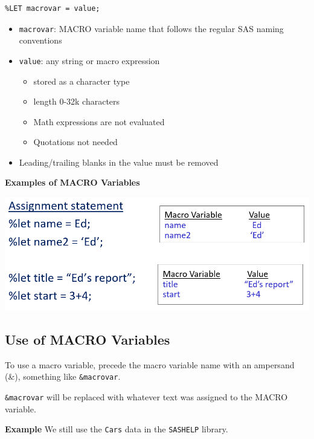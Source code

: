 \documentclass[
]{book}
\providecommand{\tightlist}{%
  \setlength{\itemsep}{0pt}\setlength{\parskip}{0pt}}
\begin{document}
\begin{verbatim}
%LET macrovar = value;
\end{verbatim}

\begin{itemize}
\tightlist
\item
  \texttt{macrovar}: MACRO variable name that follows the regular SAS naming conventions
\item
  \texttt{value}: any string or macro expression

  \begin{itemize}
  \tightlist
  \item
    stored as a character type
  \item
    length 0-32k characters
  \item
    Math expressions are not evaluated
  \item
    Quotations not needed
  \end{itemize}
\item
  Leading/trailing blanks in the value must be removed
\end{itemize}

\textbf{Examples of MACRO Variables}

\begin{center}\includegraphics[width=1\linewidth]{img14/w14-MACROVariableExample} \end{center}

\hypertarget{use-of-macro-variables}{%
\subsection{Use of MACRO Variables}\label{use-of-macro-variables}}

To use a macro variable, precede the macro variable name with an ampersand (\&), something like \texttt{\&macrovar}.

\texttt{\&macrovar} will be replaced with whatever text was assigned to the MACRO variable.

\textbf{Example} We still use the \texttt{Cars} data in the \texttt{SASHELP} library.
\end{document}
